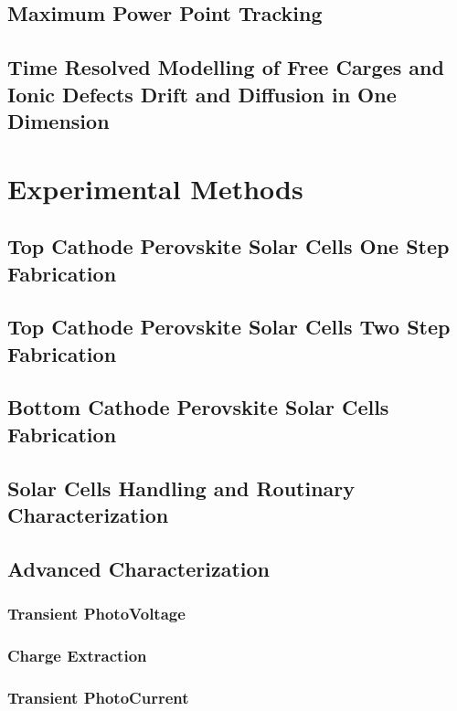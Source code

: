 \documentclass[a4paper, 12pt, openright]{book}
\begin{document}
	\section{Maximum Power Point Tracking}
	
	\section{Time Resolved Modelling of Free Carges and Ionic Defects Drift and Diffusion in One Dimension}

\chapter{Experimental Methods}

	\section{Top Cathode Perovskite Solar Cells One Step Fabrication}
	
	\section{Top Cathode Perovskite Solar Cells Two Step Fabrication}
	
	\section{Bottom Cathode Perovskite Solar Cells Fabrication}

	\section{Solar Cells Handling and Routinary Characterization}
	
	\section{Advanced Characterization}
	
		\subsection{Transient PhotoVoltage}
		
		\subsection{Charge Extraction}
		
		\subsection{Transient PhotoCurrent}
		
\end{document}
